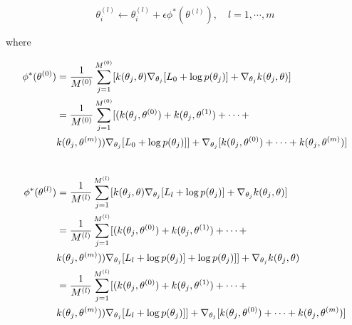 \documentclass[12pt]{article}
\renewcommand{\[}{\left[}
\renewcommand{\]}{\right]}
\renewcommand{\(}{\left(}
\renewcommand{\)}{\right)}
\newcommand{\grad}[1]{\nabla #1}
\begin{document}
\begin{equation*}
    \theta^{(l)}_i \leftarrow \theta^{(l)}_i + \epsilon \phi^{\ast}(\theta^{(l)}), \quad l=1, \cdots, m
\end{equation*}

where

\begin{align}
    \phi^{\ast}(\theta^{(0)}) &= \frac{1}{M^{(0)}}\sum_{j=1}^{M^{(0)}}[k(\theta_j, \theta) \grad_{\theta_j}[L_{0} + \log p(\theta_j)] + \grad_{\theta_j} k(\theta_j, \theta)] \\
    &= \frac{1}{M^{(0)}}\sum_{j=1}^{M^{(0)}}[(k(\theta_j, \theta^{(0)})  + k(\theta_j, \theta^{(1)}) + \cdots + \nonumber\\ 
    &k(\theta_j, \theta^{(m)})) \grad_{\theta_j}[L_{0} + \log p(\theta_j)]] + \grad_{\theta_j} [k(\theta_j, \theta^{(0)}) + \cdots + k(\theta_j, \theta^{(m)})]\\ \nonumber
\end{align}

\begin{align}
    \phi^{\ast}(\theta^{(l)}) &= \frac{1}{M^{(l)}}\sum_{j=1}^{M^{(l)}}[k(\theta_j, \theta) \grad_{\theta_j}[L_{l} + \log p(\theta_j)] + \grad_{\theta_j} k(\theta_j, \theta)] \\
    &= \frac{1}{M^{(l)}}\sum_{j=1}^{M^{(l)}}[(k(\theta_j, \theta^{(0)})  + k(\theta_j, \theta^{(1)}) + \cdots + \nonumber \\
    &k(\theta_j, \theta^{(m)})) \grad_{\theta_j}[L_{l} + \log p(\theta_j)] + \log p(\theta_j)]] + \grad_{\theta_j} k(\theta_j, \theta) \nonumber \\ 
    &= \frac{1}{M^{(l)}}\sum_{j=1}^{M^{(l)}}[(k(\theta_j, \theta^{(0)})  + k(\theta_j, \theta^{(1)}) + \cdots + \nonumber\\ 
    &k(\theta_j, \theta^{(m)})) \grad_{\theta_j}[L_{l} + \log p(\theta_j)]] + \grad_{\theta_j} [k(\theta_j, \theta^{(0)}) + \cdots + k(\theta_j, \theta^{(m)})]\\ \nonumber
\end{align}
\end{document}
